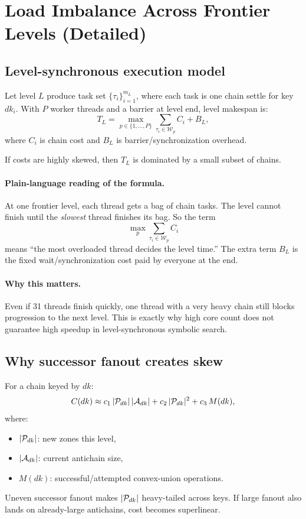 \section{Load Imbalance Across Frontier Levels (Detailed)}
\subsection{Level-synchronous execution model}
Let level $L$ produce task set $\{\tau_i\}_{i=1}^{m_L}$, where each task is one chain settle for key $dk_i$.
With $P$ worker threads and a barrier at level end, level makespan is:
\[
T_L = \max_{p\in\{1,\dots,P\}} \sum_{\tau_i\in\mathcal{W}_p} C_i + B_L,
\]
where $C_i$ is chain cost and $B_L$ is barrier/synchronization overhead.

If costs are highly skewed, then $T_L$ is dominated by a small subset of chains.

\paragraph{Plain-language reading of the formula.}
At one frontier level, each thread gets a bag of chain tasks.
The level cannot finish until the \emph{slowest} thread finishes its bag.
So the term
\[
\max_p \sum_{\tau_i\in\mathcal{W}_p} C_i
\]
means ``the most overloaded thread decides the level time.''
The extra term $B_L$ is the fixed wait/synchronization cost paid by everyone at the end.

\paragraph{Why this matters.}
Even if 31 threads finish quickly, one thread with a very heavy chain still blocks progression to the next level.
This is exactly why high core count does not guarantee high speedup in level-synchronous symbolic search.

\subsection{Why successor fanout creates skew}
For a chain keyed by $dk$:
\[
C(dk) \approx c_1\,|\mathcal{P}_{dk}|\,|\mathcal{A}_{dk}| + c_2\,|\mathcal{P}_{dk}|^2 + c_3\,M(dk),
\]
where:
\begin{itemize}
  \item $|\mathcal{P}_{dk}|$: new zones this level,
  \item $|\mathcal{A}_{dk}|$: current antichain size,
  \item $M(dk)$: successful/attempted convex-union operations.
\end{itemize}
Uneven successor fanout makes $|\mathcal{P}_{dk}|$ heavy-tailed across keys.
If large fanout also lands on already-large antichains, cost becomes superlinear.

